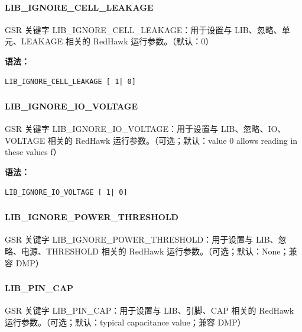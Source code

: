 \paragraph*{LIB_IGNORE_CELL_LEAKAGE}

GSR 关键字 LIB_IGNORE_CELL_LEAKAGE：用于设置与 LIB、忽略、单元、LEAKAGE 相关的 RedHawk 运行参数。（默认：0）

\textbf{语法：}
\begin{lstlisting}
LIB_IGNORE_CELL_LEAKAGE [ 1| 0]
\end{lstlisting}

\subsubsection{}
\paragraph*{LIB_IGNORE_IO_VOLTAGE}

GSR 关键字 LIB_IGNORE_IO_VOLTAGE：用于设置与 LIB、忽略、IO、VOLTAGE 相关的 RedHawk 运行参数。（可选；默认：value 0 allows reading in these values f）

\textbf{语法：}
\begin{lstlisting}
LIB_IGNORE_IO_VOLTAGE [ 1| 0]
\end{lstlisting}

\subsubsection{}
\paragraph*{LIB_IGNORE_POWER_THRESHOLD}

GSR 关键字 LIB_IGNORE_POWER_THRESHOLD：用于设置与 LIB、忽略、电源、THRESHOLD 相关的 RedHawk 运行参数。（可选；默认：None；兼容 DMP）

\subsubsection{}
\paragraph*{LIB_PIN_CAP}

GSR 关键字 LIB_PIN_CAP：用于设置与 LIB、引脚、CAP 相关的 RedHawk 运行参数。（可选；默认：typical capacitance value；兼容 DMP）

